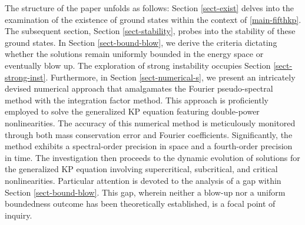 \documentclass[10pt]{article}
\numberwithin{equation}{section}
\newcommand{\dz}{\;{\rm d}x{\rm d}y}
\newcommand{\nd}{{\partial_x^{-1}}}
\newcommand{\rt}{{\mathbb{R}^2}}
\begin{document}
	
	The structure of the paper unfolds as follows: Section \ref{sect-exist} delves into the examination of the existence of ground states within the context of \eqref{main-fifthkp}. The subsequent section, Section \ref{sect-stability}, probes into the stability of these ground states. In Section \ref{sect-bound-blow}, we derive the criteria dictating whether the solutions remain uniformly bounded in the energy space or eventually blow up. The exploration of strong instability occupies Section \ref{sect-strong-inst}.
	Furthermore, in Section \ref{sect-numerical-s}, we present an intricately devised numerical approach that amalgamates the Fourier pseudo-spectral method with the integration factor method. This approach is proficiently employed to solve the generalized KP equation featuring double-power nonlinearities. The accuracy of this numerical method is meticulously monitored through both mass conservation error and Fourier coefficients. Significantly, the method exhibits a spectral-order precision in space and a fourth-order precision in time.
	The investigation then proceeds to the dynamic evolution of solutions for the generalized KP equation involving supercritical, subcritical, and critical nonlinearities. Particular attention is devoted to the analysis of a gap within Section \ref{sect-bound-blow}. This gap, wherein neither a blow-up nor a uniform boundedness outcome has been theoretically established, is a focal point of inquiry.
	
	
	
	
	
	
	
	
	
\end{document}

